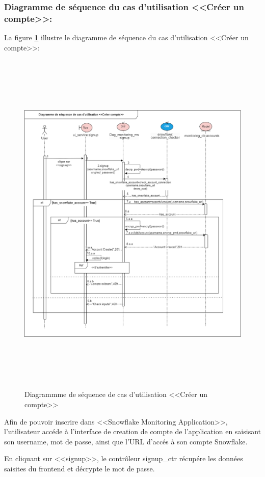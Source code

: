     \subsubsection{Diagramme de séquence du cas d'utilisation <<Créer un compte>>:}
    \par La figure \textbf{\ref*{fig:seq3}} illustre le diagramme de séquence du cas d'utilisation <<Créer un compte>>:
    \begin{figure}[H]
        \centering
        \includegraphics[height=17cm]{img/conception/signup.png}
        \caption{Diagrammme de séquence de cas d'utilisation <<Créer un compte>> }
        \label{fig:seq3}
    \end{figure}
    \par Afin de pouvoir inscrire dans <<Snowflake Monitoring Application>>, l'utilisateur accéde à l'interface de creation de compte de l'application en saisisant son username, mot de passe, 
    ainsi que l'URL d'accés à son compte Snowflake.
    \par En cliquant sur <<signup>>, le contrôleur signup\_ctr récupére les données saisites du frontend et décrypte le mot de passe.
